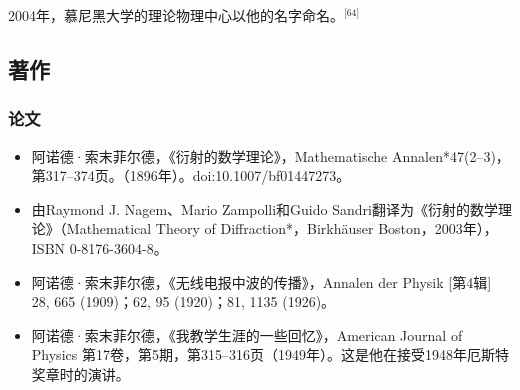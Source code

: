 2004年，慕尼黑大学的理论物理中心以他的名字命名。\(^\text{[64]}\)
\subsection{著作}
\subsubsection{论文}
\begin{itemize}
\item 阿诺德·索末菲尔德，《衍射的数学理论》，Mathematische Annalen*47(2–3)，第317–374页。（1896年）。doi:10.1007/bf01447273。
\item   由Raymond J. Nagem、Mario Zampolli和Guido Sandri翻译为《衍射的数学理论》（Mathematical Theory of Diffraction*，Birkhäuser Boston，2003年），ISBN 0-8176-3604-8。
\item 阿诺德·索末菲尔德，《无线电报中波的传播》，Annalen der Physik [第4辑] 28, 665 (1909)；62, 95 (1920)；81, 1135 (1926)。
\item 阿诺德·索末菲尔德，《我教学生涯的一些回忆》，American Journal of Physics 第17卷，第5期，第315–316页（1949年）。这是他在接受1948年厄斯特奖章时的演讲。
\end{itemize}
